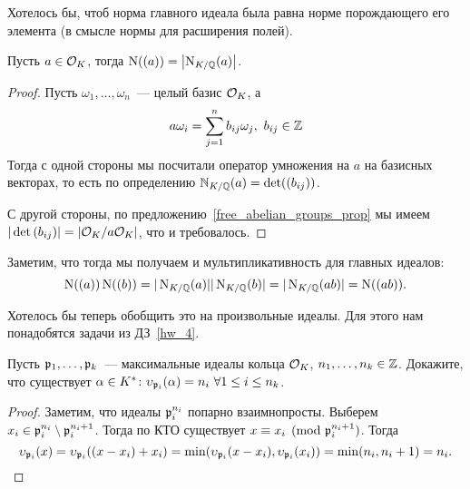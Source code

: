 	Хотелось бы, чтоб норма главного идеала была равна норме порождающего его элемента (в смысле нормы для расширения полей). 
	\begin{statement}\label{principal_ideal_norm} 
		 Пусть $a \in \mathcal{O}_{K}$, тогда $\mathrm{N}((a)) = \left\lvert\mathrm{N}_{K/\mathbb{Q}}(a)\right\rvert$.
	\end{statement}
	\begin{proof}
		Пусть $\omega_{1}, \ldots, \omega_{n}$~--- целый базис $\mathcal{O}_{K}$, а 
		\[
			a \omega_{i} = \sum\limits_{j = 1}^{n} b_{i j} \omega_{j}, \ b_{i j} \in \mathbb{Z}	
		\]
		Тогда с одной стороны мы посчитали оператор умножения на $a$ на базисных векторах, то есть по определению $\mathbb{N}_{K/\mathbb{Q}}(a) = \det((b_{i j}))$. 

		 С другой стороны, по предложению~\ref{free_abelian_groups_prop} мы имеем $|\det{(b_{i j})}| = \left\lvert \mathcal{O}_{K}/a\mathcal{O}_{K} \right\rvert$, что и требовалось. 
	\end{proof}

	Заметим, что тогда мы получаем и мультипликативность для главных идеалов: 
	\[
		\operatorname{\mathrm{N}}((a))\operatorname{\mathrm{N}}((b)) = |\operatorname{\mathrm{N}}_{K/\mathbb{Q}}(a)||\operatorname{\mathrm{N}}_{K/\mathbb{Q}}(b)| = |\operatorname{\mathrm{N}}_{K/\mathbb{Q}}(ab)| = \operatorname{\mathrm{N}}((ab)).
	\]

	Хотелось бы теперь обобщить это на произвольные идеалы. Для этого нам понадобятся задачи из ДЗ~\ref{hw_4}. 

	\begin{lemma}\label{hw_4_task_3} 
		 Пусть $\mathfrak{p}_{1}, \ldots, \mathfrak{p}_{k}$~--- максимальные идеалы кольца $\mathcal{O}_{K}$, $n_{1}, \ldots, n_{k} \in \mathbb{Z}$. Докажите, что существует $\alpha \in K^{*}\colon \upsilon_{\mathfrak{p}_{i}}(\alpha) = n_{i} \ \forall 1 \le i \le n_{k}$.
	\end{lemma}
	\begin{proof}
		Заметим, что идеалы $\mathfrak{p}_{i}^{n_{i}}$ попарно взаимнопросты. Выберем $x_{i} \in \mathfrak{p}_{i}^{n_i} \setminus \mathfrak{p}_{i}^{n_i + 1}$. Тогда по КТО существует $x \equiv x_{i} \pmod{\mathfrak{p}_{i}^{n_{i} + 1}}$. Тогда 
		\[
			\upsilon_{\mathfrak{p}_{i}}(x) = \upsilon_{\mathfrak{p}_{i}}((x - x_{i}) + x_{i}) = \min(\upsilon_{\mathfrak{p}_{i}}(x - x_i), \upsilon_{\mathfrak{p}_i}(x_i)) = \min(n_i, n_i + 1) = n_{i}.
		\]
	\end{proof}


